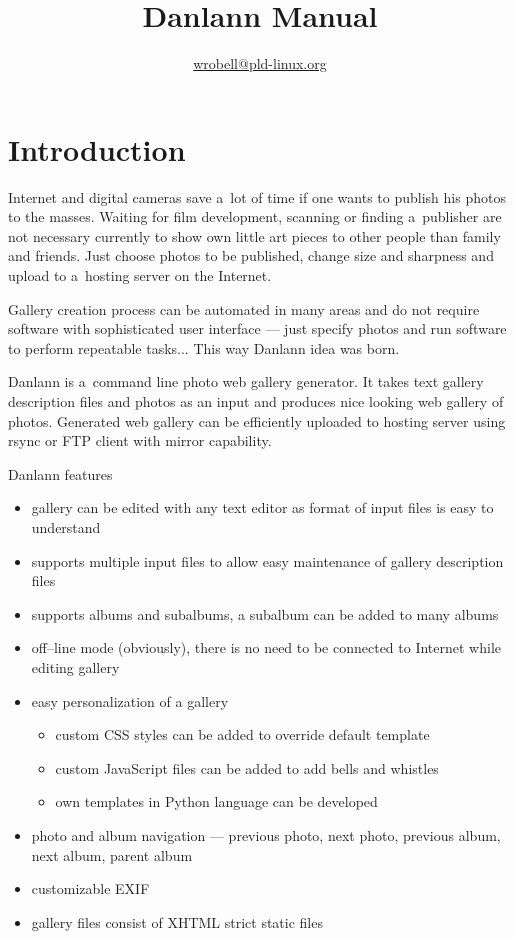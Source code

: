 \documentclass{article}
\title{Danlann Manual}
\author{\url{wrobell@pld-linux.org}}
\begin{document}
\maketitle

\tableofcontents
{}

\section{Introduction}
Internet and digital cameras save a~lot of time
if one wants to publish his photos to the masses. Waiting for film
development, scanning or finding a~publisher are not necessary currently to show
own little art pieces to other people than family and friends. Just choose
photos to be published, change size and sharpness and
upload to a~hosting server on the Internet.

Gallery creation process can be automated in many areas and do not require
software with sophisticated user interface --- just specify photos and run
software to perform repeatable tasks... This way Danlann idea was born.

Danlann is a~command line photo web gallery generator.
It takes text gallery description files and photos as an input and produces 
nice looking web gallery of photos. Generated web gallery can be
efficiently uploaded to hosting server using rsync or FTP client with
mirror capability.

Danlann features
\begin{itemize}
\itemsep0pt
\item gallery can be edited with any text editor as format of input files
    is easy to understand
\item supports multiple input files to allow easy maintenance of gallery
    description files
\item supports albums and subalbums, a subalbum can be added to many albums
\item off--line mode (obviously), there is no need to be connected to Internet while
    editing gallery
\item easy personalization of a gallery
    \begin{itemize}
    \itemsep0pt
    \item custom CSS styles can be added to override default template
    \item custom JavaScript files can be added to add bells and whistles
    \item own templates in Python language can be developed
    \end{itemize}
\item photo and album navigation --- previous photo, next photo, previous
    album, next album, parent album
\item customizable EXIF
\item gallery files consist of XHTML strict static files
\end{itemize}
\end{document}

